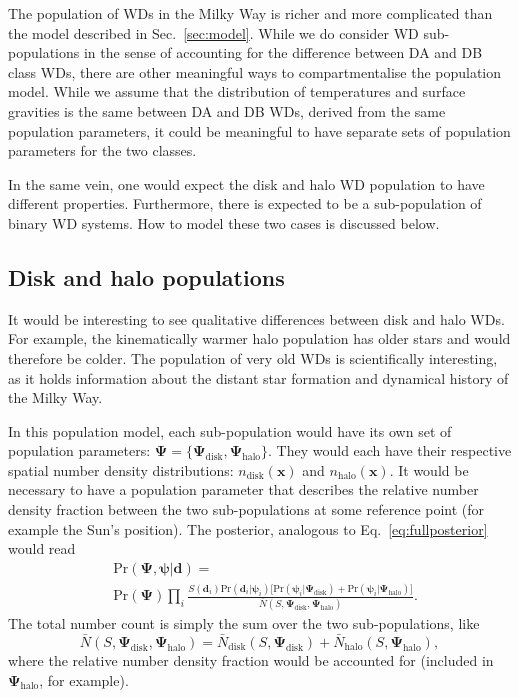\documentclass[fleqn,usenatbib]{mnras}
\newcommand{\popp}{\boldsymbol{\Psi}}
\newcommand{\objp}{\boldsymbol{\psi}}
\newcommand{\data}{\mathbf{d}}
\newcommand{\pr}{\text{Pr}}
\begin{document}
The population of WDs in the Milky Way is richer and more complicated than the model described in Sec.~\ref{sec:model}. While we do consider WD sub-populations in the sense of accounting for the difference between DA and DB class WDs, there are other meaningful ways to compartmentalise the population model. While we assume that the distribution of temperatures and surface gravities is the same between DA and DB WDs, derived from the same population parameters, it could be meaningful to have separate sets of population parameters for the two classes.

In the same vein, one would expect the disk and halo WD population to have different properties. Furthermore, there is expected to be a sub-population of binary WD systems. How to model these two cases is discussed below.



\subsection{Disk and halo populations}

It would be interesting to see qualitative differences between disk and halo WDs. For example, the kinematically warmer halo population has older stars and would therefore be colder. The population of very old WDs is scientifically interesting, as it holds information about the distant star formation and dynamical history of the Milky Way.

In this population model, each sub-population would have its own set of population parameters: $\popp = \{ \popp_\text{disk},\popp_\text{halo} \}$. They would each have their respective spatial number density distributions: $n_\text{disk}(\mathbf{x})$ and $n_\text{halo}(\mathbf{x})$. It would be necessary to have a population parameter that describes the relative number density fraction between the two sub-populations at some reference point (for example the Sun's position). The posterior, analogous to Eq.~\eqref{eq:fullposterior} would read
\begin{equation}\label{eq:posterior_disk_halo}
\begin{split}
	& \pr(\popp,\objp | \data ) = \\
	& \pr(\popp)
	\prod_i \frac{S(\data_i) \pr(\data_i | \objp_i) \Big[ \pr(\objp_i | \popp_\text{disk})+\pr(\objp_i | \popp_\text{halo}) \Big]}{\bar{N}(S,\popp_\text{disk},\popp_\text{halo})}.
\end{split}
\end{equation}
The total number count is simply the sum over the two sub-populations, like
\begin{equation}
	\bar{N}(S,\popp_\text{disk},\popp_\text{halo})=\bar{N}_\text{disk}(S,\popp_\text{disk})+\bar{N}_\text{halo}(S,\popp_\text{halo}),
\end{equation}
where the relative number density fraction would be accounted for (included in $\popp_\text{halo}$, for example).
\end{document}
